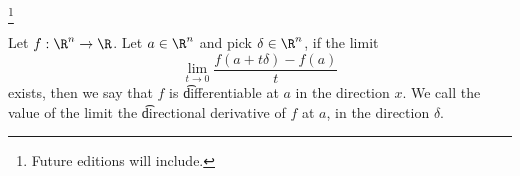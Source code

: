 
\footnote{Future editions will include.}


Let $f: \R^n \to \R$.
Let $a \in \R^n$ and pick $\delta \in \R^n$, if the limit
\[
  \lim_{t \to 0} \frac{f(a + t\delta) - f(a)}{t}
\]
exists, then we say that $f$ is \t{differentiable at $a$ in the direction $x$}.
We call the value of the limit the \t{directional derivative} of $f$ at $a$, in the direction $\delta$.


\blankpage
